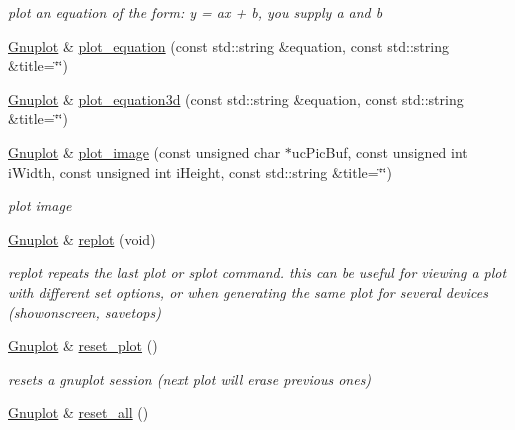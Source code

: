 \begin{DoxyCompactItemize}
\begin{DoxyCompactList}\small\item\em plot an equation of the form\+: y = ax + b, you supply a and b \end{DoxyCompactList}\item 
\hyperlink{classkukadu_1_1Gnuplot}{Gnuplot} \& \hyperlink{classkukadu_1_1Gnuplot_a96c92aa357fa26095bfeb7afcc1d7ae5}{plot\+\_\+equation} (const std\+::string \&equation, const std\+::string \&title=\char`\"{}\char`\"{})
\item 
\hyperlink{classkukadu_1_1Gnuplot}{Gnuplot} \& \hyperlink{classkukadu_1_1Gnuplot_a2500bea1234a30061b30cb66247d101e}{plot\+\_\+equation3d} (const std\+::string \&equation, const std\+::string \&title=\char`\"{}\char`\"{})
\item 
\hyperlink{classkukadu_1_1Gnuplot}{Gnuplot} \& \hyperlink{classkukadu_1_1Gnuplot_a00fa2629225493cef7be8e0263fb7fa4}{plot\+\_\+image} (const unsigned char $\ast$uc\+Pic\+Buf, const unsigned int i\+Width, const unsigned int i\+Height, const std\+::string \&title=\char`\"{}\char`\"{})
\begin{DoxyCompactList}\small\item\em plot image \end{DoxyCompactList}\item 
\hyperlink{classkukadu_1_1Gnuplot}{Gnuplot} \& \hyperlink{classkukadu_1_1Gnuplot_a775739d7e45f805b8e8d6629a7fc1e6c}{replot} (void)
\begin{DoxyCompactList}\small\item\em replot repeats the last plot or splot command. this can be useful for viewing a plot with different set options, or when generating the same plot for several devices (showonscreen, savetops) \end{DoxyCompactList}\item 
\hyperlink{classkukadu_1_1Gnuplot}{Gnuplot} \& \hyperlink{classkukadu_1_1Gnuplot_a8437ccf75a256391bc8727c72af71ba7}{reset\+\_\+plot} ()\hypertarget{classkukadu_1_1Gnuplot_a8437ccf75a256391bc8727c72af71ba7}{}\label{classkukadu_1_1Gnuplot_a8437ccf75a256391bc8727c72af71ba7}

\begin{DoxyCompactList}\small\item\em resets a gnuplot session (next plot will erase previous ones) \end{DoxyCompactList}\item 
\hyperlink{classkukadu_1_1Gnuplot}{Gnuplot} \& \hyperlink{classkukadu_1_1Gnuplot_a90fcd1025b2bc89e5d1f1d3c0ac4121e}{reset\+\_\+all} ()\hypertarget{classkukadu_1_1Gnuplot_a90fcd1025b2bc89e5d1f1d3c0ac4121e}{}\label{classkukadu_1_1Gnuplot_a90fcd1025b2bc89e5d1f1d3c0ac4121e}


\end{DoxyCompactItemize}

